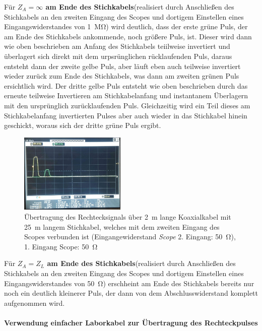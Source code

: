 \documentclass[a4paper,twoside,final]{article}
\begin{document}
Für \textbf{$Z_A = \infty$ am Ende des Stichkabels}(realisiert durch Anschließen des Stichkabels an den zweiten Eingang des Scopes und dortigem Einstellen eines Eingangswiderstandes von \SI{1}{\mega\ohm}) wird deutlich, dass der erste grüne Puls, der am Ende des Stichkabels ankommende, noch größere Puls, ist. Dieser wird dann wie oben beschrieben am Anfang des Stichkabels teiilweise invertiert und überlagert sich direkt mit dem urpsrünglichen rücklaufenden Puls, daraus entsteht dann der zweite gelbe Puls, aber läuft eben auch teilweise invertiert wieder zurück zum Ende des Stichkabels, was dann am zweiten grünen Puls ersichtlich wird. Der dritte gelbe Puls entsteht wie oben beschrieben durch das erneute teilweise Invertieren am Stichkabelanfang und instantanem Überlagern mit den ursprünglich zurücklaufenden Puls. Gleichzeitig wird ein Teil dieses am Stichkabelanfang invertierten Pulses aber auch wieder in das Stichkabel hinein geschickt, woraus sich der dritte grüne Puls ergibt. \\

\begin{figure}[htp]
    \centering
        \includegraphics[width=0.45\textwidth]{Bilder/Bild8.jpg}
    \caption{Übertragung des Rechtecksignals über \SI{2}{\metre} lange Koaxialkabel mit \SI{25}{\metre} langem Stichkabel, welches mit dem zweiten Eingang des Scopes verbunden ist (Eingangewiderstand \textit{Scope} 2. Eingang: \SI{50}{\ohm}), 1. Eingang Scope: \SI{50}{\ohm}}
\end{figure}

Für \textbf{$Z_A = Z_L$ am Ende des Stichkabels}(realisiert durch Anschließen des Stichkabels an den zweiten Eingang des Scopes und dortigem Einstellen eines Eingangswiderstandes von \SI{50}{\ohm}) erschheint am Ende des Stichkabels bereits nur noch ein deutlich kleinerer Puls, der dann von dem Abschlusswiderstand komplett aufgenommen wird.\\

\paragraph{Verwendung einfacher Laborkabel zur Übertragung des Rechteckpulses}
\end{document}
